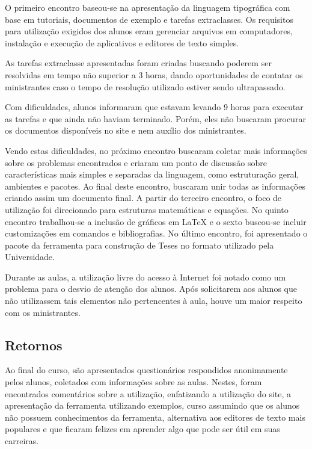 \documentclass{article}
\begin{document}
O primeiro encontro baseou-se na apresentação da linguagem tipográfica com base
em tutoriais, documentos de exemplo e tarefas extraclasses. Os requisitos para
utilização exigidos dos alunos eram gerenciar arquivos em computadores,
instalação e execução de aplicativos e editores de texto simples.

As tarefas extraclasse apresentadas foram criadas buscando poderem ser
resolvidas em tempo não superior a 3 horas, dando oportunidades de contatar os
ministrantes caso o tempo de resolução utilizado estiver sendo ultrapassado.

Com dificuldades, alunos informaram que estavam levando 9 horas para executar as
tarefas e que ainda não haviam terminado. Porém, eles não buscaram procurar os
documentos disponíveis no site e nem auxílio dos ministrantes.

Vendo estas dificuldades, no próximo encontro buscaram coletar mais informações
sobre os problemas encontrados e criaram um ponto de discussão sobre
características mais simples e separadas da linguagem, como estruturação geral,
ambientes e pacotes. Ao final deste encontro, buscaram unir todas as informações
criando assim um documento final. A partir do terceiro encontro, o foco de
utilização foi direcionado para estruturas matemáticas e equações. No quinto
encontro trabalhou-se a inclusão de gráficos em \LaTeX{} e o sexto buscou-se
incluir customizações em comandos e bibliografias. No último encontro, foi
apresentado o pacote da ferramenta para construção de Teses no formato utilizado
pela Universidade.

Durante as aulas, a utilização livre do acesso à Internet foi notado como um
problema para o desvio de atenção dos alunos. Após solicitarem aos alunos que
não utilizassem tais elementos não pertencentes à aula, houve um maior respeito
com os ministrantes.

\subsection{Retornos}

Ao final do curso, são apresentados questionários respondidos anonimamente pelos
alunos, coletados com informações sobre as aulas. Nestes, foram encontrados
comentários sobre a utilização, enfatizando a utilização do site, a apresentação
da ferramenta utilizando exemplos, curso assumindo que os alunos não possuem
conhecimentos da ferramenta, alternativa aos editores de texto mais populares e
que ficaram felizes em aprender algo que pode ser útil em suas carreiras.
\end{document}
